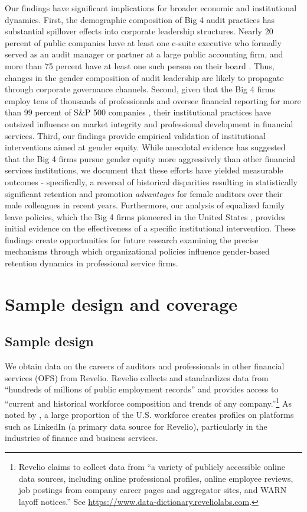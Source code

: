 \documentclass[11pt]{article}
\begin{document}
    Our findings have significant implications for broader economic and institutional dynamics. First, the demographic composition of Big 4 audit practices has substantial spillover effects into corporate leadership structures. Nearly 20 percent of public companies have at least one c-suite executive who formally served as an audit manager or partner at a large public accounting firm, and more than 75 percent have at least one such person on their board \parencite{albrechtAuditorsRecognizePotential2018}. Thus, changes in the gender composition of audit leadership are likely to propagate through corporate governance channels. Second, given that the Big 4 firms employ tens of thousands of professionals and oversee financial reporting for more than 99 percent of S\&P 500 companies \parencite{pakalukAuditorMarketShare2017}, their institutional practices have outsized influence on market integrity and professional development in financial services. Third, our findings provide empirical validation of institutional interventions aimed at gender equity. While anecdotal evidence has suggested that the Big 4 firms pursue gender equity more aggressively than other financial services institutions, we document that these efforts have yielded measurable outcomes - specifically, a reversal of historical disparities resulting in statistically significant retention and promotion \textit{advantages} for female auditors over their male colleagues in recent years. Furthermore, our analysis of equalized family leave policies, which the Big 4 firms pioneered in the United States \parencite{ballesteroImportanceOrganizationalCulture2023}, provides initial evidence on the effectiveness of a specific institutional intervention. These findings create opportunities for future research examining the precise mechanisms through which organizational policies influence gender-based retention dynamics in professional service firms.

\section{Sample design and coverage} \label{section:Data}  
    
    \subsection{Sample design} \label{section:sampleDesign}
        We obtain data on the careers of auditors and professionals in other financial services (OFS) from Revelio. Revelio collects and standardizes data from ``hundreds of millions of public employment records'' and provides access to ``current and historical workforce composition and trends of any company.''\footnote{Revelio claims to collect data from ``a variety of publicly accessible online data sources, including online professional profiles, online employee reviews, job postings from company career pages and aggregator sites, and WARN layoff notices.'' See \url{https://www.data-dictionary.reveliolabs.com}.} As noted by \textcite{agrawalInformationDispersionEmployees2021}, a large proportion of the U.S. workforce creates profiles on platforms such as LinkedIn (a primary data source for Revelio), particularly in the industries of finance and business services. 
        
\end{document}
